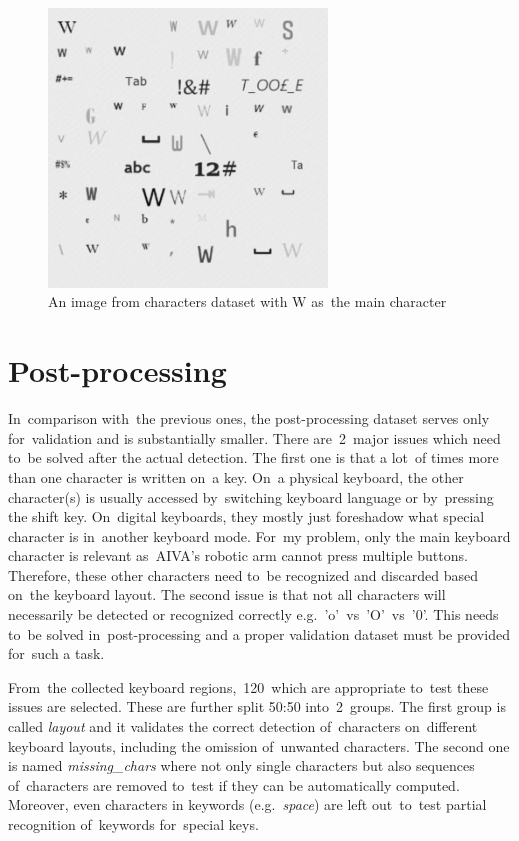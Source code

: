 \vspace{-12pt}
\begin{figure}[!hbt]
    \centering
    \includegraphics[width=0.66\textwidth]{img/dataset/characters-img-W.png}
    \vspace{-6pt}
    \caption{An image from characters dataset with W as~the main character}
    \label{dataset-characters-image}
\end{figure}

\section{Post-processing}
\label{dataset-postprocessing}

In~comparison with~the previous ones, the post-processing dataset serves only for~validation and is substantially smaller. There are~2~major issues which need to~be solved after the actual detection. The first one is that a lot~of times more than one character is written on~a key. On~a physical keyboard, the other character(s) is usually accessed by~switching keyboard language or by~pressing the shift key. On~digital keyboards, they mostly just foreshadow what special character is in~another keyboard mode. For~my problem, only the main keyboard character is relevant as~AIVA's robotic arm cannot press multiple buttons. Therefore, these other characters need to~be recognized and discarded based on~the keyboard layout. The second issue is that not all characters will necessarily be detected or recognized correctly e.g.~'o'~vs~'O'~vs~'0'. This needs to~be solved in~post-processing and a proper validation dataset must be provided for~such a task.

From~the collected keyboard regions,~120~which are appropriate to~test these issues are selected. These are further split 50:50 into~2~groups. The first group is called \emph{layout} and it validates the correct detection of~characters on~different keyboard layouts, including the omission of~unwanted characters. The second one is named \emph{missing\_chars} where not only single characters but also sequences of~characters are removed to~test if they can be automatically computed. Moreover, even characters in keywords (e.g.~\emph{space}) are left out~to~test partial recognition of~keywords for~special keys.
